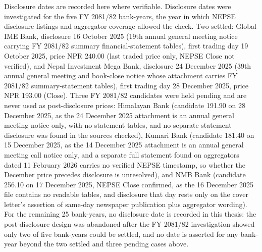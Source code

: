 Disclosure dates are recorded here where verifiable. Disclosure dates were investigated for the five FY 2081/82 bank-years, the year in which NEPSE disclosure listings and aggregator coverage allowed the check. Two settled: Global IME Bank, disclosure 16 October 2025 (19th annual general meeting notice carrying FY 2081/82 summary financial-statement tables), first trading day 19 October 2025, price NPR 240.00 (last traded price only, NEPSE Close not verified), and Nepal Investment Mega Bank, disclosure 24 December 2025 (39th annual general meeting and book-close notice whose attachment carries FY 2081/82 summary-statement tables), first trading day 28 December 2025, price NPR 193.00 (Close). Three FY 2081/82 candidates were held pending and are never used as post-disclosure prices: Himalayan Bank (candidate 191.90 on 28 December 2025, as the 24 December 2025 attachment is an annual general meeting notice only, with no statement tables, and no separate statement disclosure was found in the sources checked), Kumari Bank (candidate 181.40 on 15 December 2025, as the 14 December 2025 attachment is an annual general meeting call notice only, and a separate full statement found on aggregators dated 11 February 2026 carries no verified NEPSE timestamp, so whether the December price precedes disclosure is unresolved), and NMB Bank (candidate 256.10 on 17 December 2025, NEPSE Close confirmed, as the 16 December 2025 file contains no readable tables, and disclosure that day rests only on the cover letter's assertion of same-day newspaper publication plus aggregator wording). For the remaining 25 bank-years, no disclosure date is recorded in this thesis: the post-disclosure design was abandoned after the FY 2081/82 investigation showed only two of five bank-years could be settled, and no date is asserted for any bank-year beyond the two settled and three pending cases above.

